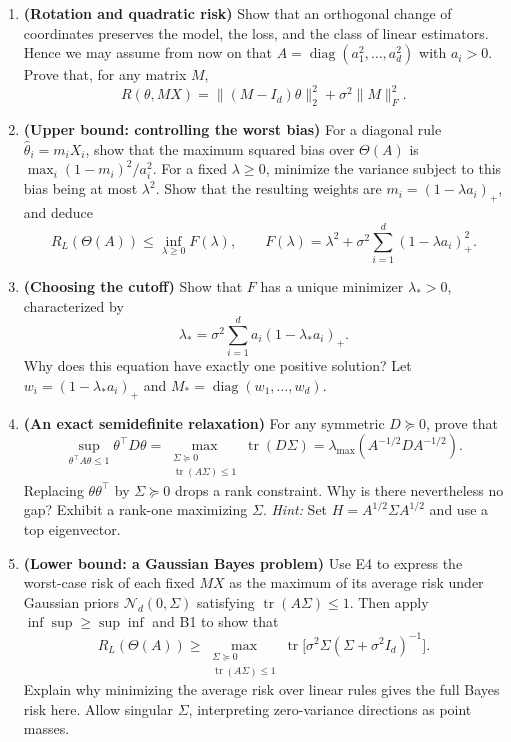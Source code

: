 \begin{enumerate}[label=\textcolor{AccentInk}{\sffamily\bfseries E\arabic*.},ref=E\arabic*,leftmargin=2.65em,labelsep=0.65em,itemsep=1em]
\item \textbf{(Rotation and quadratic risk)} Show that an orthogonal change of coordinates preserves the model, the loss, and the class of linear estimators. Hence we may assume from now on that $A=\operatorname{diag}(a_1^2,\ldots,a_d^2)$ with $a_i>0$. Prove that, for any matrix $M$,
\[
 R(\theta,MX)=\|(M-I_d)\theta\|_2^2+\sigma^2\|M\|_F^2.
\]

\newpage
\item \textbf{(Upper bound: controlling the worst bias)} For a diagonal rule $\hat\theta_i=m_iX_i$, show that the maximum squared bias over $\Theta(A)$ is $\max_i(1-m_i)^2/a_i^2$. For a fixed $\lambda\ge0$, minimize the variance subject to this bias being at most $\lambda^2$. Show that the resulting weights are $m_i=(1-\lambda a_i)_+$, and deduce
\[
 R_L(\Theta(A))\le\inf_{\lambda\ge0}F(\lambda),\qquad
 F(\lambda)=\lambda^2+\sigma^2\sum_{i=1}^d(1-\lambda a_i)_+^2.
\]

\item \textbf{(Choosing the cutoff)} Show that $F$ has a unique minimizer $\lambda_*>0$, characterized by
\[
 \lambda_*=\sigma^2\sum_{i=1}^d a_i(1-\lambda_*a_i)_+.
\]
Why does this equation have exactly one positive solution? Let $w_i=(1-\lambda_*a_i)_+$ and $M_*=\operatorname{diag}(w_1,\ldots,w_d)$.

\item \textbf{(An exact semidefinite relaxation)} For any symmetric $D\succeq0$, prove that
\[
 \sup_{\theta^\top A\theta\le1}\theta^\top D\theta
 =\max_{\substack{\Sigma\succeq0\\\operatorname{tr}(A\Sigma)\le1}}\operatorname{tr}(D\Sigma)
 =\lambda_{\max}(A^{-1/2}DA^{-1/2}).
\]
Replacing $\theta\theta^\top$ by $\Sigma\succeq0$ drops a rank constraint. Why is there nevertheless no gap? Exhibit a rank-one maximizing $\Sigma$. \emph{Hint:} Set $H=A^{1/2}\Sigma A^{1/2}$ and use a top eigenvector.

\item \textbf{(Lower bound: a Gaussian Bayes problem)} Use E4 to express the worst-case risk of each fixed $MX$ as the maximum of its average risk under Gaussian priors $\mathcal N_d(0,\Sigma)$ satisfying $\operatorname{tr}(A\Sigma)\le1$. Then apply $\inf\sup\ge\sup\inf$ and B1 to show that
\[
 R_L(\Theta(A))\ge\max_{\substack{\Sigma\succeq0\\\operatorname{tr}(A\Sigma)\le1}}\operatorname{tr}\bigl[\sigma^2\Sigma(\Sigma+\sigma^2I_d)^{-1}\bigr].
\]
Explain why minimizing the average risk over linear rules gives the full Bayes risk here. Allow singular $\Sigma$, interpreting zero-variance directions as point masses.


\end{enumerate}
